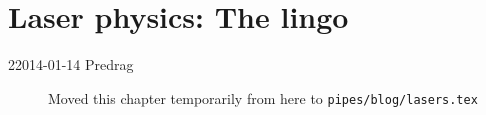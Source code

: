
\chapter{Laser physics: The lingo}
\label{chap:lasers}


\begin{description}

\item[22014-01-14  Predrag] Moved this chapter temporarily from here to
\texttt{pipes/blog/lasers.tex}

\end{description}
